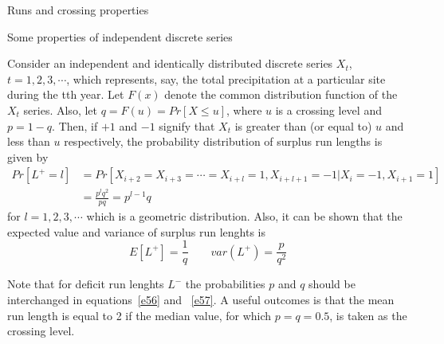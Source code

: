 \documentclass[8pt]{beamer}
\renewcommand{\emph}[1]{\textcolor{myorange}{#1}}
\begin{document}
 \begin{frame}{Runs and crossing properties}
     \begin{block}{Some properties of independent discrete series}
    \end{block}
    Consider an independent and identically distributed discrete series $X_t$, $t=1,2,3, \cdots$, which represents, say, the \emph{total precipitation} at a particular site during the tth year. Let $F(x)$ denote the common distribution function of the $X_t$ series. Also, let $q = F(u) = Pr[X \leq u]$, where $u$ is a crossing level and $p = 1-q$. Then, if $+1$ and $-1$ signify that $X_t$ is greater than (or equal to) $u$ and less than $u$ respectively, the probability distribution of \emph{surplus run lengths} is given by
    \begin{equation}
    \begin{aligned}
        Pr[L^+ = l] &= Pr \left[X_{i+2} = X_{i+3} = \cdots = X_{i+l} = 1, X_{i+l+1} = -1 | X_i = -1, X_{i+1} = 1 \right] \\
                    &= \frac{p^l q^2}{pq} = p^{l-1} q
    \end{aligned}
    \label{e56}
    \end{equation}
    for $l=1,2,3, \cdots$ which is a \emph{geometric distribution}. Also, it can be shown that the expected value and variance of \emph{surplus run lenghts} is 
    \begin{equation}
        E[L^+] = \frac{1}{q} \quad \quad var(L^+) = \frac{p}{q^2}
    \label{e57}
    \end{equation}

    Note that for \emph{deficit run lenghts} $L^-$ the probabilities $p$ and $q$ should be interchanged in equations~\ref{e56} and ~\ref{e57}. A useful outcomes is that the \emph{mean run length} is equal to 2 if the median value, for which $p=q=0.5$, is taken as the \emph{crossing level}. 

 
\end{frame}
 
\end{document}
